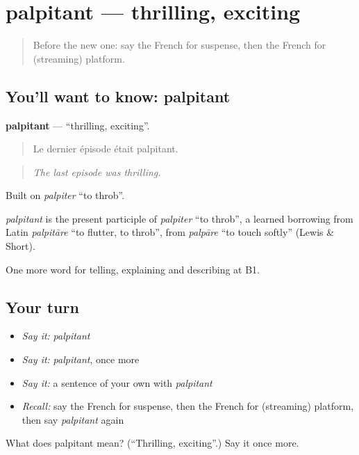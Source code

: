 \section[palpitant]{palpitant — thrilling, exciting}

\label{lesson:FR-C523-palpitant}



\begin{quote}
Before the new one: say the French for suspense, then the French for (streaming) platform.
\end{quote}

\subsection*{You'll want to know: palpitant}
\textbf{palpitant} — \textquotedblleft{}thrilling, exciting\textquotedblright{}.

\begin{quote}
Le dernier épisode était palpitant.
\end{quote}

\begin{quote}
\emph{The last episode was thrilling.}
\end{quote}

Built on \emph{palpiter} \textquotedblleft{}to throb\textquotedblright{}.

\begin{cousinweb}
\emph{palpitant} is the present participle of \emph{palpiter} \textquotedblleft{}to throb\textquotedblright{}, a learned borrowing from Latin \emph{palpitāre} \textquotedblleft{}to flutter, to throb\textquotedblright{}, from \emph{palpāre} \textquotedblleft{}to touch softly\textquotedblright{} (Lewis \& Short).
\end{cousinweb}

\begin{grammarlens}[title={What you've built}]
One more word for telling, explaining and describing at B1.
\end{grammarlens}

\subsection*{Your turn}
\begin{itemize}
\raggedright
  \item \emph{Say it:} \emph{palpitant}
  \item \emph{Say it:} \emph{palpitant}, once more
  \item \emph{Say it:} a sentence of your own with \emph{palpitant}
  \item \emph{Recall:} say the French for suspense, then the French for (streaming) platform, then say \emph{palpitant} again
\end{itemize}

\begin{tcolorbox}[breakable,colback=teal!4,colframe=teal!35!black,title={Before you move on}]
What does palpitant mean? (\textquotedblleft{}Thrilling, exciting\textquotedblright{}.) Say it once more.
\end{tcolorbox}
